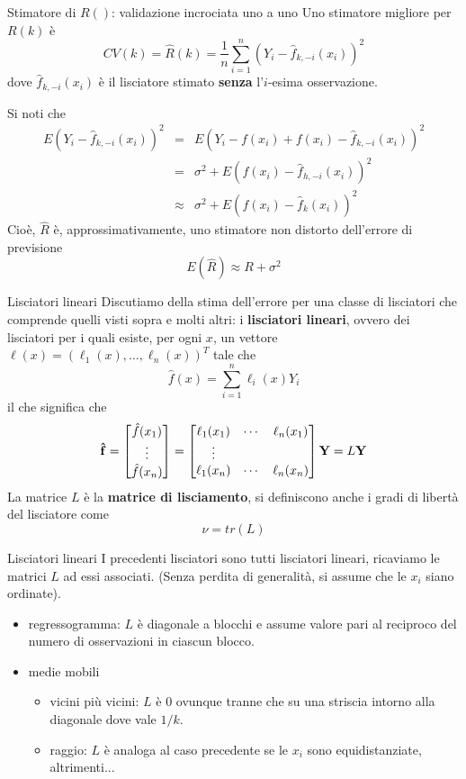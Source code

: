 \documentclass{beamer}\usepackage[]{graphicx}\usepackage[]{color}
\begin{document}
\begin{frame}{Stimatore di $R()$: validazione incrociata uno  a uno}
Uno stimatore migliore per $R(k)$ \`e
\[
CV(k) = \hat{R}(k) =\frac{1}{n} \sum_{i=1}^n (Y_i - \hat{f}_{k,-i}(x_i))^2
\]
dove $\hat{f}_{k,-i}(x_i)$ \`e il lisciatore stimato {\bf senza} l'$i$-esima osservazione.

Si noti che
\begin{eqnarray*}
E(Y_i-\hat{f}_{k,-i}(x_i))^2 
&=& E(Y_i-f(x_i)+f(x_i)-\hat{f}_{k,-i}(x_i))^2 \\
&=& \sigma^2 + E(f(x_i)-\hat{f}_{h,-i}(x_i))^2 \\
&\approx& \sigma^2 + E(f(x_i)-\hat{f}_{k}(x_i))^2 
\end{eqnarray*}
Cio\`e, $\hat{R}$ \`e, approssimativamente, uno stimatore non distorto dell'errore di previsione
\[ E(\hat{R}) \approx R + \sigma^2  \]
\end{frame}


\begin{frame}{Lisciatori lineari}
Discutiamo della stima dell'errore per una classe di lisciatori che comprende quelli visti sopra e molti altri: i {\bf lisciatori lineari}, ovvero dei lisciatori per i quali esiste, per ogni $x$, un vettore $\ell(x)=(\ell_1(x),\ldots,\ell_n(x))^T$ tale che
\[ \hat{f}(x) = \sum_{i=1}^n \ell_i(x) Y_i  \]
il che significa che
\[
{\bf\hat{f}} =
\begin{bmatrix}
\hat{f}(x_1) \\ \vdots \\ \hat{f}(x_n)
\end{bmatrix}
=
\begin{bmatrix}
\ell_1(x_1) & \cdots & \ell_n(x_1) \\ \vdots \\ \ell_1(x_n) & \cdots & \ell_n(x_n) 
\end{bmatrix}
{\bf Y} 
= L{\bf Y}
\]
La matrice $L$ \`e la {\bf matrice di lisciamento}, si definiscono anche i gradi di libert\`a del lisciatore come
\[ \nu = tr(L) \]
\end{frame}

\begin{frame}{Lisciatori lineari}
I precedenti lisciatori sono tutti lisciatori lineari, ricaviamo le matrici $L$ ad essi associati. 
(Senza perdita di generalit\`a, si assume che le $x_i$ siano ordinate).
\begin{itemize}
\item regressogramma:  $L$ \`e diagonale a blocchi e assume valore pari al reciproco del numero di osservazioni in ciascun blocco.
\item medie mobili 
\begin{itemize}
\item vicini pi\`u vicini: $L$ \`e 0 ovunque tranne che su una striscia intorno alla diagonale dove vale $1/k$.
\item raggio: $L$ \`e analoga al caso precedente se le $x_i$ sono equidistanziate, altrimenti...
\end{itemize}
\end{itemize}
\end{frame}
\end{document}

